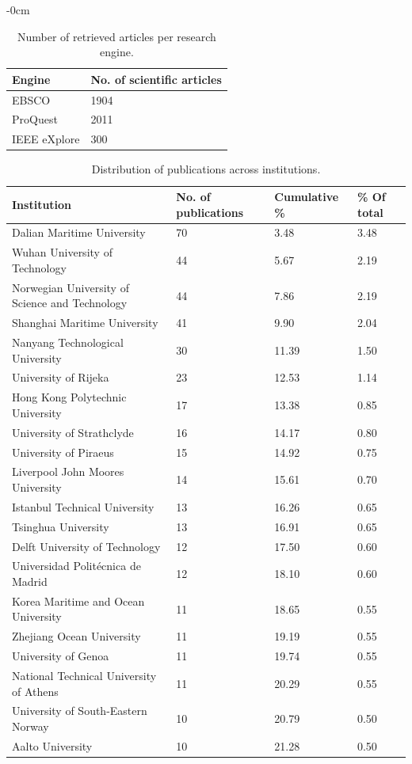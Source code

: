 \documentclass[jmse,review,submit,pdftex,moreauthors]{Definitions/mdpi}
\begin{document}
\begin{adjustwidth}{-\extralength}{0cm}
\begin{table}[H]
	\centering
	\caption{Number of retrieved articles per research engine.}
	\begin{tabularx}{\linewidth}{XX}
		\hline
		Engine & No. of scientific articles \\
		\hline
		EBSCO & 1904 \\
		ProQuest & 2011 \\
		IEEE eXplore & 300 \\
		\hline
	\end{tabularx}
	\label{tab:searchres}
\end{table}

\begin{table}[H]
	\centering
	\caption{Distribution of publications across institutions.}
	\begin{tabularx}{\linewidth}{p{4cm}XXp{2cm}}
		\hline
		Institution & No. of publications & Cumulative \% & \% Of total \\
		\hline
		Dalian Maritime University & 70 & 3.48 & 3.48\\
		Wuhan University of Technology & 44 & 5.67 & 2.19\\
		Norwegian University of Science and Technology & 44 & 7.86 & 2.19\\
		Shanghai Maritime University & 41 & 9.90 & 2.04\\
		Nanyang Technological University & 30 & 11.39 & 1.50\\
		University of Rijeka & 23 & 12.53 & 1.14\\
		Hong Kong Polytechnic University & 17 & 13.38 & 0.85\\
		University of Strathclyde & 16 & 14.17 & 0.80\\
		University of Piraeus & 15 & 14.92 & 0.75\\
		Liverpool John Moores University & 14 & 15.61 & 0.70\\
		Istanbul Technical University & 13 & 16.26 & 0.65\\
		Tsinghua University & 13 & 16.91 & 0.65\\
		Delft University of Technology & 12 & 17.50 & 0.60\\
		Universidad Politécnica de Madrid & 12 & 18.10 & 0.60\\
		Korea Maritime and Ocean University & 11 & 18.65 & 0.55\\
		Zhejiang Ocean University & 11 & 19.19 & 0.55\\
		University of Genoa & 11 & 19.74 & 0.55\\
		National Technical University of Athens & 11 & 20.29 & 0.55\\
		University of South-Eastern Norway & 10 & 20.79 & 0.50\\
		Aalto University & 10 & 21.28 & 0.50\\
		\hline
	\end{tabularx}
	\label{tab:resdescinst}
\end{table}


\end{adjustwidth}
\end{document}
